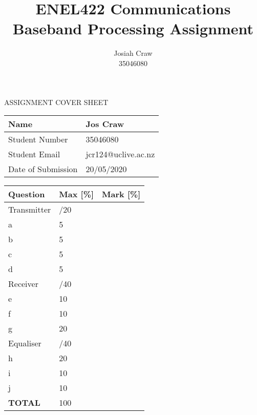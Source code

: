 \documentclass{article}
\title{ENEL422 Communications Baseband Processing Assignment}
\author{Josiah Craw\\35046080}
\begin{document}
\begin{center}
    {\huge ASSIGNMENT COVER SHEET}
\end{center}

\vspace{3em}

\begin{center}
    \renewcommand*{\arraystretch}{1.2}
    \begin{tabular} { | m{5cm} | m{4cm} | }
        \hline
        {\large Name} & {\large Jos Craw}\\
        \hline
        {\large Student Number} & {\large 35046080}\\
        \hline
        {\large Student Email} & {\large jcr124@uclive.ac.nz}\\
        \hline
        {\large Date of Submission} & {\large 20/05/2020}\\
        \hline
    \end{tabular}
\end{center}

\vspace{5em}

\begin{center}
    \renewcommand*{\arraystretch}{1.4}
    \begin{tabular} { | m{3cm} | m{3cm} | m{5cm} | }
        \hline
        {\large Question} & {\large Max [\%]} & {\large Mark [\%]} \\
        \hline
        {\large Transmitter} & {\large /20} & {\large }\\
        \hline
        {\large a} & {\large 5} & {\large}\\
        \hline
        {\large b} & {\large 5} & {\large}\\
        \hline
        {\large c} & {\large 5} & {\large}\\
        \hline
        {\large d} & {\large 5} & {\large}\\
        \hline
        {\large Receiver} & {\large /40} & {\large }\\
        \hline
        {\large e} & {\large 10} & {\large}\\
        \hline
        {\large f} & {\large 10} & {\large}\\
        \hline
        {\large g} & {\large 20} & {\large}\\
        \hline
        {\large Equaliser} & {\large /40} & {\large }\\
        \hline
        {\large h} & {\large 20} & {\large}\\
        \hline
        {\large i} & {\large 10} & {\large}\\
        \hline
        {\large j} & {\large 10} & {\large}\\
        \hline
        {\large \textbf{TOTAL}} & {\large 100} & {\large}\\
        \hline
    \end{tabular}
\end{center}
\end{document}
